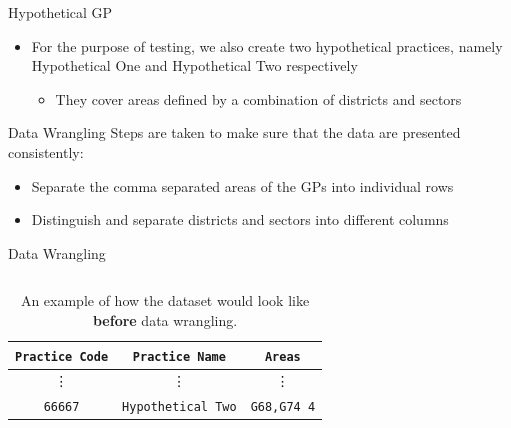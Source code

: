 \documentclass[hyperref={breaklinks,colorlinks,
   urlcolor=blue,citecolor=blue,linkcolor=red}]{beamer}
\begin{document}
\begin{frame}{Hypothetical GP}
\begin{itemize}
\item{For the purpose of testing, we also create two hypothetical practices, namely Hypothetical One and Hypothetical Two respectively}
\begin{itemize}
\item{They cover areas defined by a combination of districts and sectors}
\end{itemize}
\end{itemize}
\end{frame}

\begin{frame}{Data Wrangling}
Steps are taken to make sure that
the data are presented consistently:
\begin{itemize}
\item{Separate the comma separated areas of the GPs into
individual rows}
\item{Distinguish and separate districts and sectors into different columns}
\end{itemize}
\end{frame}

\begin{frame}{Data Wrangling}
\begin{columns}
\begin{column}{\dimexpr\paperwidth-10pt}
\begin{table}
\begin{center}
\begin{tabular}{c | c | c}
\toprule
\texttt{Practice Code} & \texttt{Practice Name} & \texttt{Areas} \\
\midrule
\midrule
\vdots & \vdots & \vdots\\
\texttt{66667} & \texttt{Hypothetical Two} & \texttt{G68,G74 4}\\ 
\bottomrule
\end{tabular}
\caption{An example of how the dataset would look like \textbf{before} data wrangling.}
\end{center}
\end{table}
\end{column}
\end{columns}
\end{frame}
\end{document}
